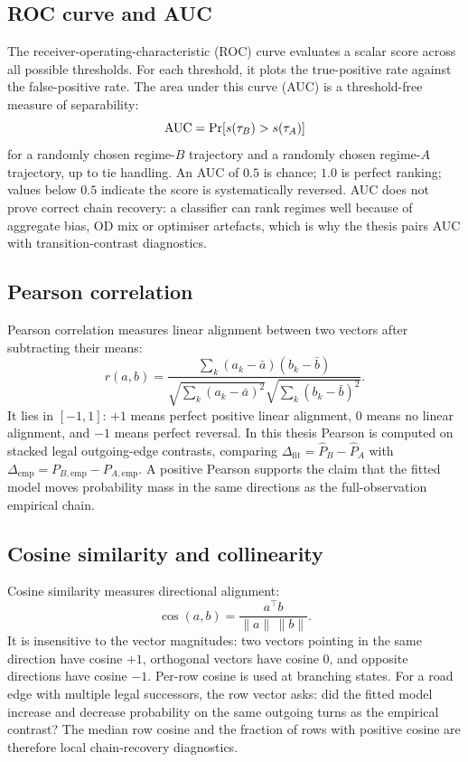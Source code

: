 \subsection{ROC curve and AUC}
\label{app:auc-primer}

The receiver-operating-characteristic (ROC) curve evaluates a scalar
score across all possible thresholds. For each threshold, it plots the
true-positive rate against the false-positive rate. The area under this
curve (AUC) is a threshold-free measure of separability:
\[
\mathrm{AUC} = \Pr[s(\tau_B) > s(\tau_A)]
\]
for a randomly chosen regime-$B$ trajectory and a randomly chosen
regime-$A$ trajectory, up to tie handling. An AUC of $0.5$ is chance;
$1.0$ is perfect ranking; values below $0.5$ indicate the score is
systematically reversed. AUC does not prove correct chain
recovery: a classifier can rank regimes well because of aggregate bias,
OD mix or optimiser artefacts, which is why the thesis pairs AUC with
transition-contrast diagnostics.

\subsection{Pearson correlation}
\label{app:pearson-primer}

Pearson correlation measures linear alignment between two vectors after
subtracting their means:
\[
r(a,b)=
\frac{\sum_k (a_k-\bar a)(b_k-\bar b)}
{\sqrt{\sum_k(a_k-\bar a)^2}\sqrt{\sum_k(b_k-\bar b)^2}}.
\]
It lies in $[-1,1]$: $+1$ means perfect positive linear alignment, $0$
means no linear alignment, and $-1$ means perfect reversal. In this
thesis Pearson is computed on stacked legal outgoing-edge contrasts,
comparing
$\Delta_{\mathrm{fit}}=\hat{P}_B-\hat{P}_A$ with
$\Delta_{\mathrm{emp}}=P_{B,\mathrm{emp}}-P_{A,\mathrm{emp}}$. A positive
Pearson supports the claim that the fitted model moves probability mass
in the same directions as the full-observation empirical chain.

\subsection{Cosine similarity and collinearity}
\label{app:cosine-primer}

Cosine similarity measures directional alignment:
\[
\cos(a,b)=\frac{a^\top b}{\|a\|\,\|b\|}.
\]
It is insensitive to the vector magnitudes: two vectors pointing in the
same direction have cosine $+1$, orthogonal vectors have cosine $0$, and
opposite directions have cosine $-1$. Per-row cosine is used at branching
states. For a road edge with multiple legal successors, the row vector
asks: did the fitted model increase and decrease probability on the same
outgoing turns as the empirical contrast? The median row cosine and the
fraction of rows with positive cosine are therefore local
chain-recovery diagnostics.

